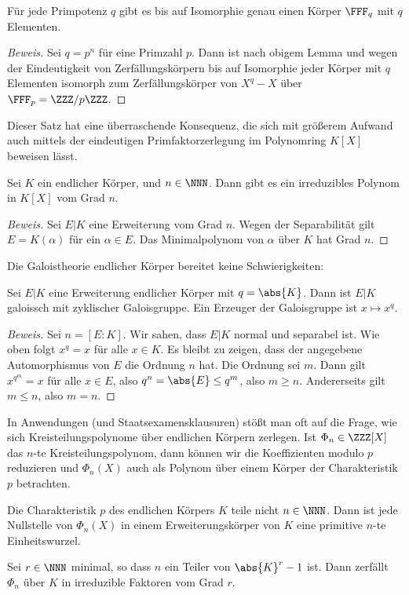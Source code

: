 \documentclass[12pt,a4paper,twoside]{article}
\begin{document}
\begin{Korollar}
  F\"ur jede Primpotenz $q$ gibt es bis auf Isomorphie genau einen K\"orper
  $\FFF_q$ mit $q$ Elementen.
\end{Korollar}
\begin{proof}[Beweis]
  Sei $q=p^n$ f\"ur eine Primzahl $p$. Dann ist nach obigem Lemma und wegen
  der Eindeutigkeit von Zerf\"allungsk\"orpern bis auf Isomorphie jeder
  K\"orper mit $q$ Elementen isomorph zum Zerf\"allungsk\"orper von $X^q-X$
  \"uber $\FFF_p=\ZZZ/p\ZZZ$.
\end{proof}
Dieser Satz hat eine \"uberraschende Konsequenz, die sich mit gr\"o\ss erem
Aufwand auch mittels der eindeutigen Primfaktorzerlegung im Polynomring $K[X]$
beweisen l\"asst.
\begin{Korollar}
  Sei $K$ ein endlicher K\"orper, und $n\in\NNN$. Dann gibt es ein
  irreduzibles Polynom in $K[X]$ vom Grad $n$.
\end{Korollar}
\begin{proof}[Beweis]
  Sei $E|K$ eine Erweiterung vom Grad $n$. Wegen der Separabilit\"at gilt
  $E=K(\alpha)$ f\"ur ein $\alpha\in E$. Das Minimalpolynom von $\alpha$
  \"uber $K$ hat Grad $n$.
\end{proof}
Die Galoistheorie endlicher K\"orper bereitet keine Schwierigkeiten:
\begin{Satz}
  Sei $E|K$ eine Erweiterung endlicher K\"orper mit $q=\abs{K}$. Dann ist
  $E|K$ galoissch mit zyklischer Galoisgruppe. Ein Erzeuger der Galoisgruppe
  ist $x\mapsto x^q$.
\end{Satz}
\begin{proof}[Beweis]
  Sei $n=[E:K]$. Wir sahen, dass $E|K$ normal und separabel ist. Wie oben
  folgt $x^q=x$ f\"ur alle $x\in K$. Es bleibt zu zeigen, dass der angegebene
  Automorphismus von $E$ die Ordnung $n$ hat. Die Ordnung sei $m$. Dann gilt
  $x^{q^m}=x$ f\"ur alle $x\in E$, also $q^n=\abs{E}\le q^m$, also $m\ge n$.
  Andererseits gilt $m\le n$, also $m=n$.
\end{proof}
In Anwendungen (und Staatsexamensklausuren) st\"o\ss t man oft auf die Frage,
wie sich Kreisteilungspolynome \"uber endlichen K\"orpern zerlegen. Ist
$\Phi_n\in\ZZZ[X]$ das $n$-te Kreisteilungspolynom, dann k\"onnen wir die
Koeffizienten modulo $p$ reduzieren und $\Phi_n(X)$ auch als Polynom \"uber
einem K\"orper der Charakteristik $p$ betrachten.
\begin{Satz}
  Die Charakteristik $p$ des endlichen K\"orpers $K$ teile nicht
  $n\in\NNN$. Dann ist jede Nullstelle von $\Phi_n(X)$ in einem
  Erweiterungsk\"orper von $K$ eine primitive $n$-te Einheitswurzel.
  
  Sei $r\in\NNN$ minimal, so dass $n$ ein Teiler von $\abs{K}^r-1$ ist. Dann
  zerf\"allt $\Phi_n$ \"uber $K$ in irreduzible Faktoren vom Grad $r$.
\end{Satz}
\end{document}
